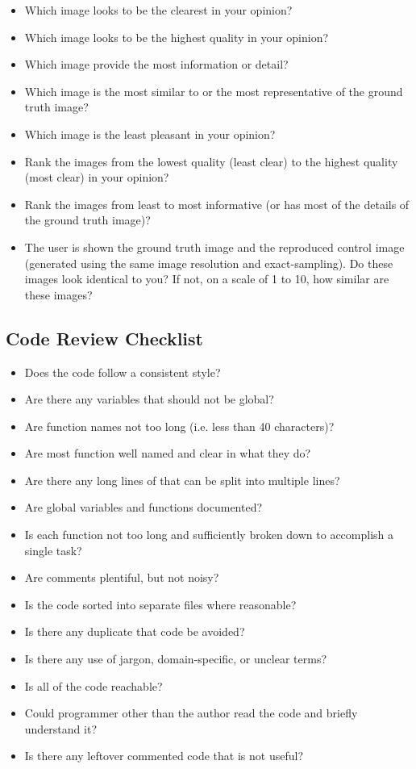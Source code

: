 \documentclass[12pt, titlepage]{article}
\begin{document}
\begin{itemize}
  \item{Which image looks to be the clearest in your opinion?}
  \item{Which image looks to be the highest quality in your opinion?}
  \item{Which image provide the most information or detail?}
  \item{Which image is the most similar to or the most representative of the ground truth image?}
  \item{Which image is the least pleasant in your opinion?}
  \item{Rank the images from the lowest quality (least clear) to the highest quality (most clear) in your opinion?}
  \item{Rank the images from least to most informative (or has most of the details of the ground truth image)?}
  \item{The user is shown the ground truth image and the reproduced control image 
  (generated using the same image resolution and exact-sampling). 
  Do these images look identical to you? If not, on a scale of 1 to 10, how similar are these images?}
\end{itemize}

\subsection{Code Review Checklist} \label{checklist_codeReview}


\begin{itemize}
  \item{Does the code follow a consistent style?}
  \item{Are there any variables that should not be global?}
  \item{Are function names not too long (i.e. less than 40 characters)?}
  \item{Are most function well named and clear in what they do?}
  \item{Are there any long lines of that can be split into multiple lines?}
  \item{Are global variables and functions documented?}
  \item{Is each function not too long and sufficiently broken down to accomplish a single task?}
  \item{Are comments plentiful, but not noisy?}
  \item{Is the code sorted into separate files where reasonable?}
  \item{Is there any duplicate that code be avoided?}
  \item{Is there any use of jargon, domain-specific, or unclear terms?}
  \item{Is all of the code reachable?}
  \item{Could programmer other than the author read the code and briefly understand it?}
  \item{Is there any leftover commented code that is not useful?}
\end{itemize}
\end{document}
